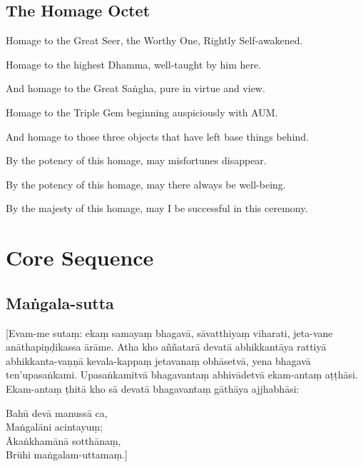 \subsection{The Homage Octet}

Homage to the Great Seer, the Worthy One, Rightly Self-awakened.

Homage to the highest Dhamma, well-taught by him here.

And homage to the Great Saṅgha, pure in virtue and view.

Homage to the Triple Gem beginning auspiciously with AUM.

And homage to those three objects that have left base things behind.

By the potency of this homage, may misfortunes disappear.

By the potency of this homage, may there always be well-being.

By the majesty of this homage, may I be successful in this ceremony.

\section{Core Sequence}

\subsection{Maṅgala-sutta}
\label{asevana}

[Evam-me sutaṃ: ekaṃ samayaṃ bhagavā, sāvatthiyaṃ viharati, jeta-vane
anāthapiṇḍikassa ārāme. Atha kho aññatarā devatā abhikkantāya rattiyā
abhikkanta-vaṇṇā kevala-kappaṃ jetavanaṃ obhāsetvā, yena bhagavā ten'upasaṅkami.
Upasaṅkamitvā bhagavantaṃ abhivādetvā ekam-antaṃ aṭṭhāsi. Ekam-antaṃ ṭhitā kho
sā devatā bhagavantaṃ gāthāya ajjhabhāsi:

Bahū devā manussā ca,\\
Maṅgalāni acintayuṃ;\\
Ākaṅkhamānā sotthānaṃ,\\
Brūhi maṅgalam-uttamaṃ.]

\bigskip


